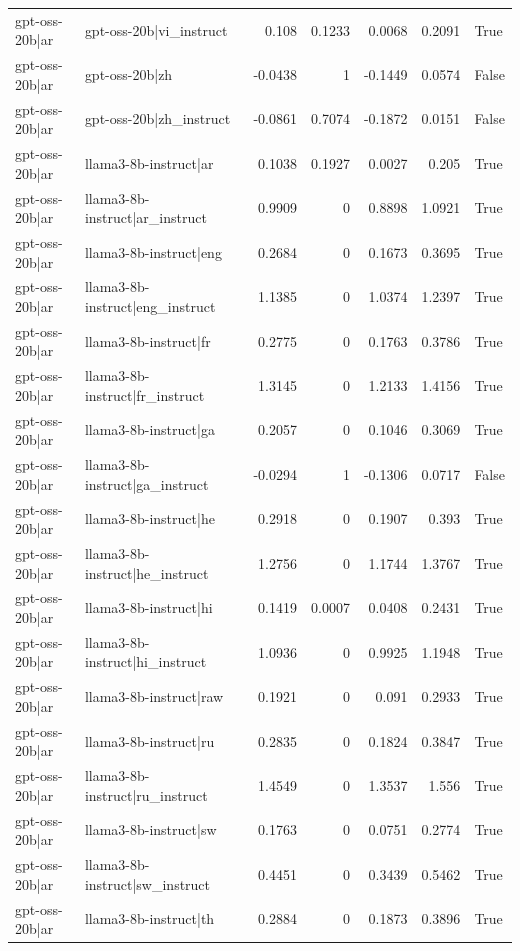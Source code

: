 \begin{table}
\begin{tabular}{l l r r r r l}
gpt-oss-20b|ar & gpt-oss-20b|vi_instruct & 0.108 & 0.1233 & 0.0068 & 0.2091 & True \\
gpt-oss-20b|ar & gpt-oss-20b|zh & -0.0438 & 1 & -0.1449 & 0.0574 & False \\
gpt-oss-20b|ar & gpt-oss-20b|zh_instruct & -0.0861 & 0.7074 & -0.1872 & 0.0151 & False \\
gpt-oss-20b|ar & llama3-8b-instruct|ar & 0.1038 & 0.1927 & 0.0027 & 0.205 & True \\
gpt-oss-20b|ar & llama3-8b-instruct|ar_instruct & 0.9909 & 0 & 0.8898 & 1.0921 & True \\
gpt-oss-20b|ar & llama3-8b-instruct|eng & 0.2684 & 0 & 0.1673 & 0.3695 & True \\
gpt-oss-20b|ar & llama3-8b-instruct|eng_instruct & 1.1385 & 0 & 1.0374 & 1.2397 & True \\
gpt-oss-20b|ar & llama3-8b-instruct|fr & 0.2775 & 0 & 0.1763 & 0.3786 & True \\
gpt-oss-20b|ar & llama3-8b-instruct|fr_instruct & 1.3145 & 0 & 1.2133 & 1.4156 & True \\
gpt-oss-20b|ar & llama3-8b-instruct|ga & 0.2057 & 0 & 0.1046 & 0.3069 & True \\
gpt-oss-20b|ar & llama3-8b-instruct|ga_instruct & -0.0294 & 1 & -0.1306 & 0.0717 & False \\
gpt-oss-20b|ar & llama3-8b-instruct|he & 0.2918 & 0 & 0.1907 & 0.393 & True \\
gpt-oss-20b|ar & llama3-8b-instruct|he_instruct & 1.2756 & 0 & 1.1744 & 1.3767 & True \\
gpt-oss-20b|ar & llama3-8b-instruct|hi & 0.1419 & 0.0007 & 0.0408 & 0.2431 & True \\
gpt-oss-20b|ar & llama3-8b-instruct|hi_instruct & 1.0936 & 0 & 0.9925 & 1.1948 & True \\
gpt-oss-20b|ar & llama3-8b-instruct|raw & 0.1921 & 0 & 0.091 & 0.2933 & True \\
gpt-oss-20b|ar & llama3-8b-instruct|ru & 0.2835 & 0 & 0.1824 & 0.3847 & True \\
gpt-oss-20b|ar & llama3-8b-instruct|ru_instruct & 1.4549 & 0 & 1.3537 & 1.556 & True \\
gpt-oss-20b|ar & llama3-8b-instruct|sw & 0.1763 & 0 & 0.0751 & 0.2774 & True \\
gpt-oss-20b|ar & llama3-8b-instruct|sw_instruct & 0.4451 & 0 & 0.3439 & 0.5462 & True \\
gpt-oss-20b|ar & llama3-8b-instruct|th & 0.2884 & 0 & 0.1873 & 0.3896 & True \\

\end{tabular}
\end{table}
